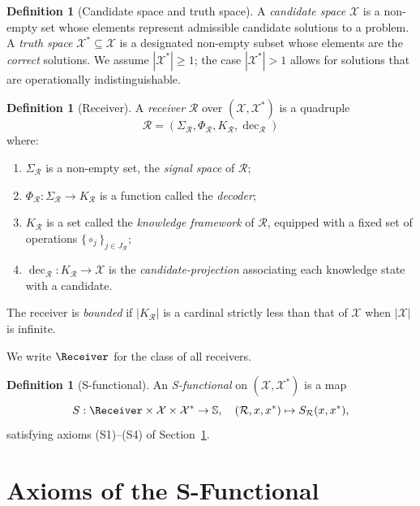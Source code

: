 \documentclass[twocolumn,11pt,a4paper]{article}
\theoremstyle{thmstyle}
\theoremstyle{thmstyle}
\theoremstyle{definition}
\newtheorem{definition}[theorem]{Definition}
\theoremstyle{remark}
\DeclareMathOperator{\dec}{dec}
\newcommand{\Sscale}{\mathbb{S}}
\newcommand{\Cands}{\mathcal{X}}
\newcommand{\Truth}{\mathcal{X}^{*}}
\newcommand{\receiver}{\mathcal{R}}
\newcommand{\Sscalar}{S}
\begin{document}
\begin{definition}[Candidate space and truth space]
\label{def:candidate-truth}
A \emph{candidate space} $\Cands$ is a non-empty set
whose elements represent admissible candidate solutions
to a problem.  A \emph{truth space} $\Truth \subseteq \Cands$
is a designated non-empty subset whose elements are the
\emph{correct} solutions. We assume $|\Truth| \geq 1$; the
case $|\Truth| > 1$ allows for solutions that are
operationally indistinguishable.
\end{definition}

\begin{definition}[Receiver]\label{def:receiver}
A \emph{receiver} $\receiver$ over $(\Cands, \Truth)$ is a
quadruple
\[
\receiver = (\Sigma_{\receiver}, \Phi_{\receiver},
              K_{\receiver}, \dec_{\receiver})
\]
where:
\begin{enumerate}[nosep,label=(\roman*)]
\item $\Sigma_{\receiver}$ is a non-empty set, the
      \emph{signal space} of $\receiver$;
\item $\Phi_{\receiver}: \Sigma_{\receiver} \to K_{\receiver}$
      is a function called the \emph{decoder};
\item $K_{\receiver}$ is a set called the
      \emph{knowledge framework} of $\receiver$,
      equipped with a fixed set of operations
      $\{\circ_{j}\}_{j \in J_{\receiver}}$;
\item $\dec_{\receiver}: K_{\receiver} \to \Cands$ is the
      \emph{candidate-projection} associating each
      knowledge state with a candidate.
\end{enumerate}
The receiver is \emph{bounded} if $|K_{\receiver}|$ is a
cardinal strictly less than that of $\Cands$ when
$|\Cands|$ is infinite.
\end{definition}

We write $\Receiver$ for the class of all receivers.

\begin{definition}[S-functional]\label{def:s-functional}
An \emph{S-functional} on $(\Cands, \Truth)$ is a map
\[
\Sscalar : \Receiver \times \Cands \times \Truth \to \Sscale,
\quad (\receiver, x, x^{*}) \mapsto \Sscalar_{\receiver}(x, x^{*}),
\]
satisfying axioms (S1)--(S4) of Section~\ref{sec:s-axioms}.
\end{definition}

\section{Axioms of the S-Functional}
\label{sec:s-axioms}
\end{document}
